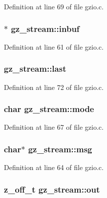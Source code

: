Definition at line 69 of file gzio.\-c.

\hypertarget{structgz__stream_a332c5ae7b5ccd1a571d89ab15940ea70}{
\subsubsection[{inbuf}]{$\ast$ gz\-\_\-stream\-::inbuf}}\label{structgz__stream_a332c5ae7b5ccd1a571d89ab15940ea70}


Definition at line 61 of file gzio.\-c.

\hypertarget{structgz__stream_a7c5213935b324dfb9a4101a73dd24a37}{
\subsubsection[{last}]{ gz\-\_\-stream\-::last}}\label{structgz__stream_a7c5213935b324dfb9a4101a73dd24a37}


Definition at line 72 of file gzio.\-c.

\hypertarget{structgz__stream_a1a78082ea3705a5ea837dbfb9c19268f}{
\subsubsection[{mode}]{\setlength{\rightskip}{0pt plus 5cm}char gz\-\_\-stream\-::mode}}\label{structgz__stream_a1a78082ea3705a5ea837dbfb9c19268f}


Definition at line 67 of file gzio.\-c.

\hypertarget{structgz__stream_afe7afcaffe9005256f416273c8049ae5}{
\subsubsection[{msg}]{\setlength{\rightskip}{0pt plus 5cm}char$\ast$ gz\-\_\-stream\-::msg}}\label{structgz__stream_afe7afcaffe9005256f416273c8049ae5}


Definition at line 64 of file gzio.\-c.

\hypertarget{structgz__stream_a2a414dd95210bef0643cfe60678f72c0}{
\subsubsection[{out}]{\setlength{\rightskip}{0pt plus 5cm}z\-\_\-off\-\_\-t gz\-\_\-stream\-::out}}\label{structgz__stream_a2a414dd95210bef0643cfe60678f72c0}


